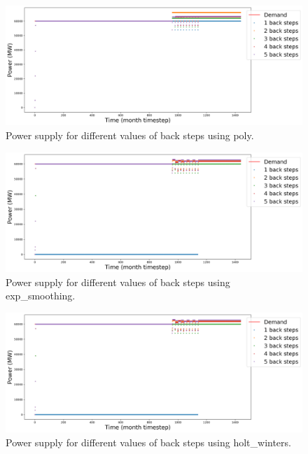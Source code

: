 \documentclass[11pt]{article}
\begin{document}
\begin{figure}[!h]
	\centering
	\includegraphics[width=\textwidth]{23-figures/23-power-buffer0-poly-back.png} 
	\hfill
	\caption{Power supply for different values of back steps using poly.}
	\label{fig:23-back-poly}
\end{figure}

\begin{figure}[!h]
	\centering
	\includegraphics[width=\textwidth]{23-figures/23-power-buffer0-exp_smoothing-back.png} 
	\hfill
	\caption{Power supply for different values of back steps using exp\_smoothing.}
	\label{fig:23-back-exp_smoothing}
\end{figure}

\begin{figure}[!h]
	\centering
	\includegraphics[width=\textwidth]{23-figures/23-power-buffer0-holt_winters-back.png} 
	\hfill
	\caption{Power supply for different values of back steps using holt\_winters.}
	\label{fig:23-back-hots_winters}
\end{figure}
\end{document}

